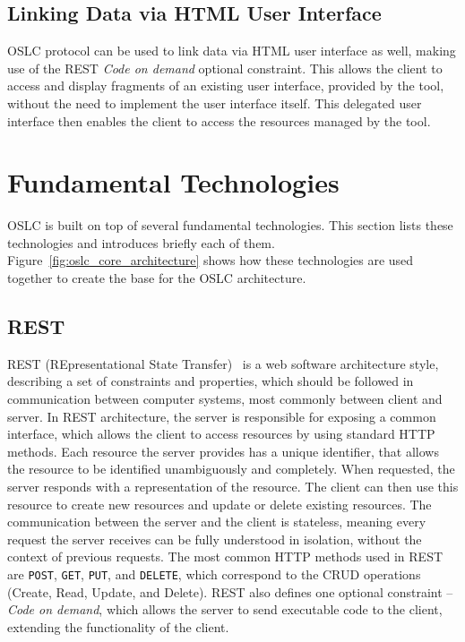 \subsection*{Linking Data via HTML User Interface}
\label {sec:oslc_linking_data_via_html_user_interface}
OSLC protocol can be used to link data via HTML user interface as well, making use of the REST \emph{Code on demand} optional constraint. This allows the client to access and display fragments of an existing user interface, provided by the tool, without the need to implement the user interface itself. This delegated user interface then enables the client to access the resources managed by the tool.

\section{Fundamental Technologies}
\label {sec:oslc_fundamental_technologies}
OSLC is built on top of several fundamental technologies. This section lists these technologies and introduces briefly each of them. Figure \ref{fig:oslc_core_architecture} shows how these technologies are used together to create the base for the OSLC architecture.

\subsection*{REST}
REST (REpresentational State Transfer) \cite{rest} is a web software architecture style, describing a set of constraints and properties, which should be followed in communication between computer systems, most commonly between client and server. In REST architecture, the server is responsible for exposing a common interface, which allows the client to access resources by using standard HTTP methods. Each resource the server provides has a unique identifier, that allows the resource to be identified unambiguously and completely. When requested, the server responds with a representation of the resource. The client can then use this resource to create new resources and update or delete existing resources. The communication between the server and the client is stateless, meaning every request the server receives can be fully understood in isolation, without the context of previous requests. The most common HTTP methods used in REST are \texttt{POST}, \texttt{GET}, \texttt{PUT}, and \texttt{DELETE}, which correspond to the CRUD operations (Create, Read, Update, and Delete). REST also defines one optional constraint -- \emph{Code on demand}, which allows the server to send executable code to the client, extending the functionality of the client.

